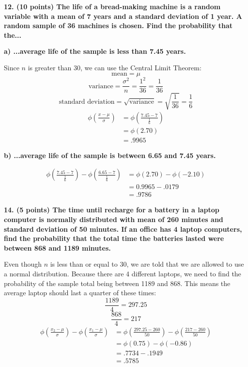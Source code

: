 \documentclass[12pt, letter]{article}
\begin{document}
\textbf{12. (10 points) The life of a bread-making machine is a random variable with a mean of 7 years and a standard deviation of 1 year. A random sample of 36 machines is chosen. Find the probability that the...}

\qquad \textbf{a) ...average life of the sample is less than 7.45 years.}
\begin{center}
	Since $n$ is greater than 30, we can use the Central Limit Theorem:
	$$\text{mean} = \mu$$
	$$\text{variance} = \frac{\sigma^{2}}{n} = \frac{1^{2}}{36} = \frac{1}{36}$$
	$$\text{standard deviation} = \sqrt{\text{variance}} = \sqrt{\frac{1}{36}} = \frac{1}{6}$$
	\begin{align*}
		\phi \left(\frac{x - \mu}{\sigma}\right) &= \phi \left(\frac{7.45 - 7}{\frac{1}{6}}\right) \\
		&= \phi(2.70) \\
		&= \boxed{.9965}
	\end{align*}
\end{center}

\pagebreak

\qquad \textbf{b) ...average life of the sample is between 6.65 and 7.45 years.}
\begin{center}
	\begin{align*}
		\phi \left(\frac{7.45 - 7}{\frac{1}{6}}\right) - \phi \left(\frac{6.65 - 7}{\frac{1}{6}}\right) &= \phi(2.70) - \phi(-2.10) \\
		&= 0.9965 - .0179 \\
		&= \boxed{.9786}
	\end{align*}
\end{center}

\textbf{14. (5 points) The time until recharge for a battery in a laptop computer is normally distributed with mean of 260 minutes and standard deviation of 50 minutes. If an office has 4 laptop computers, find the probability that the total time the batteries lasted were between 868 and 1189 minutes.}
\begin{center}
	Even though $n$ is less than or equal to 30, we are told that we are allowed to use a normal distribution. Because there are 4 different laptops, we need to find the probability of the sample total being between 1189 and 868. This means the average laptop should last a quarter of these times:
	$$\frac{1189}{4} = 297.25$$
	$$\frac{868}{4} = 217$$
	\begin{align*}
		\phi \left(\frac{x_{2} - \mu}{\sigma}\right) - \phi \left(\frac{x_{1} - \mu}{\sigma}\right) &= \phi \left(\frac{297.25 - 260}{50}\right) - \phi \left(\frac{217 - 260}{50}\right) \\
		&= \phi(0.75) - \phi(-0.86) \\
		&= .7734 - .1949 \\
		&= \boxed{.5785}
	\end{align*}
\end{center}
\end{document}
